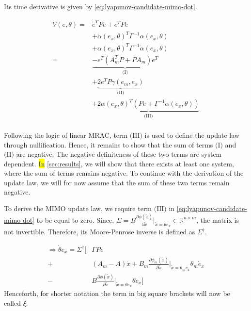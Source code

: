 Its time derivative is given by \eqref{eq:lyapunov-candidate-mimo-dot}.

\begin{equation}
    \begin{aligned}
        \dot V(e,\theta) = &  \dot e^T P e + e^T P \dot e \\
        & + \dot\alpha(e_x,\theta)^T\Gamma^{-1}\alpha(e_x,\theta)\\ 
        & + \alpha(e_x,\theta)^T\Gamma^{-1}\dot\alpha(e_x,\theta)\\
        = & \underbrace{-e^T(A_m^TP + PA_m)e^T}_{\textrm{(I)}} \\
        & + \underbrace{2e^TP\gamma(e_m,e_x)}_{\textrm{(II)}} \\
        & + \underbrace{2\alpha(e_x,\theta)^T(Pe+\Gamma^{-1}\dot\alpha(e_x,\theta))}_{\textrm{(III)}}\\
    \end{aligned}
    \label{eq:lyapunov-candidate-mimo-dot}
\end{equation}

Following the logic of linear MRAC, term $\textrm{(III)}$ is used to define the update law through nullification. Hence, it remains to show that the sum of terms $\textrm{(I)}$ and $\textrm{(II)}$ are negative. The negative definiteness of these two terms are system dependent. \hl{In} \cref{sec:results}, we will show that there exists at least one system, where the sum of terms remains negative. To continue with the derivation of the update law, we will for now assume that the sum of these two terms remain negative.

To derive the MIMO update law, we require term $\textrm{(III)}$ in \cref{eq:lyapunov-candidate-mimo-dot} to be equal to zero. Since, $\Sigma=B \frac{\partial \phi(\tilde x)}{\partial \tilde x}\vert_{\tilde x=\theta e_x}\in\mathbb{R}^{n\times m}$, the matrix is not invertible. Therefore, its Moore-Penrose inverse is defined as $\Sigma^{\dagger}$.

\begin{equation}
    \begin{aligned}
        \Rightarrow \dot\theta e_x = \Sigma^{\dagger}
        \biggl[ &\Gamma Pe \\
           + & (A_m-A)\dot x + B_m \frac{\partial \phi_m(\tilde x)}{\partial \tilde x}\vert_{\tilde x=\theta_m e_x}\theta_m \dot e_x \\
           - & B \frac{\partial \phi(\tilde x)}{\partial \tilde x}\vert_{\tilde x=\theta e_x}\theta \dot e_x \biggr]
    \end{aligned}
    \label{eq:moore-penrose2}
\end{equation}
Henceforth, for shorter notation the term in big square brackets will now be called $\xi$.

